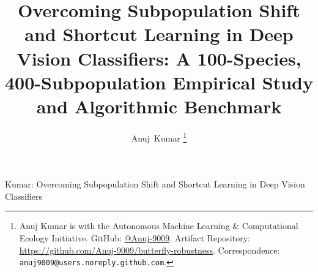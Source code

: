 \documentclass[10pt,journal,compsoc]{IEEEtran}
\begin{document}
\title{Overcoming Subpopulation Shift and Shortcut Learning in Deep Vision Classifiers: A 100-Species, 400-Subpopulation Empirical Study and Algorithmic Benchmark}

\author{Anuj~Kumar%
\thanks{Anuj Kumar is with the Autonomous Machine Learning \& Computational Ecology Initiative. GitHub: \href{https://github.com/Anuj-9009}{@Anuj-9009}. Artifact Repository: \href{https://github.com/Anuj-9009/butterfly-robustness}{https://github.com/Anuj-9009/butterfly-robustness}. Correspondence: \texttt{anuj9009@users.noreply.github.com}.}%
}

%
{Kumar: Overcoming Subpopulation Shift and Shortcut Learning in Deep Vision Classifiers}
\end{document}
